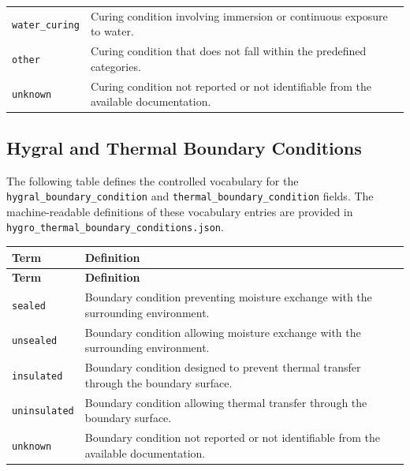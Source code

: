 \documentclass[11pt]{book}
\begin{document}
{\begin{longtable}{p{}p{}}
\texttt{water\_curing} &
Curing condition involving immersion or continuous exposure to water. \\

\texttt{other} &
Curing condition that does not fall within the predefined categories. \\

\texttt{unknown} &
Curing condition not reported or not identifiable from the available documentation. \\

\hline
\end{longtable}


\subsection{Hygral and Thermal Boundary Conditions}
\label{vocab:boundary_conditions_list}

The following table defines the controlled vocabulary for the \texttt{hygral\_boundary\_condition} and \texttt{thermal\_boundary\_condition} fields. The machine-readable definitions of these vocabulary entries are  provided in \texttt{hygro\_thermal\_boundary\_conditions.json}.

\begin{longtable}{p{}p{}}
\hline
\textbf{Term} & \textbf{Definition} \\
\hline
\endfirsthead

\hline
\textbf{Term} & \textbf{Definition} \\
\hline
\endhead

\texttt{sealed} &
Boundary condition preventing moisture exchange with the surrounding environment. \\

\texttt{unsealed} &
Boundary condition allowing moisture exchange with the surrounding environment. \\

\texttt{insulated} &
Boundary condition designed to prevent thermal transfer through the boundary surface. \\

\texttt{uninsulated} &
Boundary condition allowing thermal transfer through the boundary surface. \\

\texttt{unknown} &
Boundary condition not reported or not identifiable from the available documentation. \\

\hline
\end{longtable}



}
\end{document}
